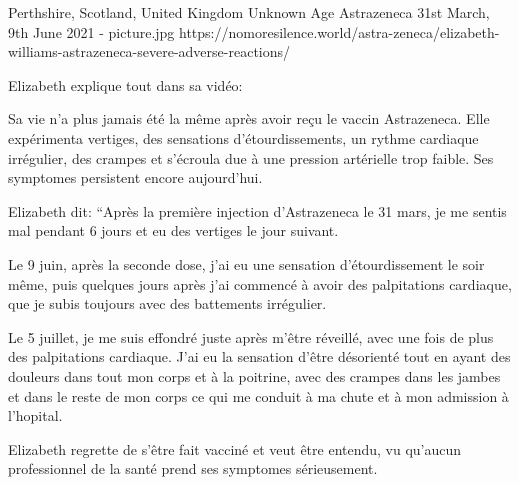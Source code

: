 {Perthshire, Scotland, United Kingdom}
{Unknown Age}
{Astrazeneca}
{31st March, 9th June 2021}
{-}
{picture.jpg}
{https://nomoresilence.world/astra-zeneca/elizabeth-williams-astrazeneca-severe-adverse-reactions/}
{

Elizabeth explique tout dans sa vidéo:

Sa vie n'a plus jamais été la même après avoir reçu le vaccin Astrazeneca. Elle expérimenta vertiges, des sensations d'étourdissements, un rythme cardiaque irrégulier, des crampes et s'écroula due à une pression artérielle trop faible. Ses symptomes persistent encore aujourd'hui.

Elizabeth dit: “Après la première injection d'Astrazeneca le 31 mars, je me sentis mal pendant 6 jours et eu des vertiges le jour suivant.

Le 9 juin, après la seconde dose, j'ai eu une sensation d'étourdissement le soir même, puis quelques jours après j'ai commencé à avoir des palpitations cardiaque, que je subis toujours avec des battements irrégulier.

Le 5 juillet, je me suis effondré juste après m'être réveillé, avec une fois de plus des palpitations cardiaque. J'ai eu la sensation d'être désorienté tout en ayant des douleurs dans tout mon corps et à la poitrine, avec des crampes dans les jambes et dans le reste de mon corps ce qui me conduit à ma chute et à mon admission à l'hopital.

Elizabeth regrette de s'être fait vacciné et veut être entendu, vu qu'aucun professionnel de la santé prend ses symptomes sérieusement.

}
